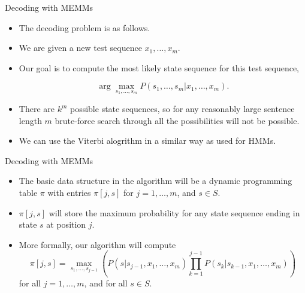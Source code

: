 \documentclass[handout]{beamer}
\begin{document}
\begin{frame}{Decoding with MEMMs}
\begin{scriptsize}
\begin{itemize}

\item The decoding problem is as follows.
\item We are given a new test sequence $x_1, \dots, x_m$.
\item Our goal is to compute the most likely state sequence for this test sequence,

\begin{equation}
 \operatorname{arg} \max_{s_1,\dots,s_m} P(s_1,\dots,s_m|x_1,\dots,x_m).
\end{equation}

\item There are $k^m$ possible state sequences, so for any reasonably large sentence length $m$ brute-force search through all the possibilities will not be possible.

\item We can use the Viterbi alogrithm in a similar way as used for HMMs.
 
\end{itemize}


\end{scriptsize}
\end{frame}



\begin{frame}{Decoding with MEMMs}
\begin{scriptsize}
\begin{itemize}

\item The basic data structure in the algorithm will be a dynamic programming table $\pi$ with entries $\pi[j,s]$ for $j=1, \dots, m$, and $s \in S$.

\item  $\pi[j,s]$ will store the maximum probability for any state sequence ending in state $s$ at position $j$.

\item More formally, our algorithm will compute 
\begin{displaymath}
\pi[j,s] =  \max_{s_1,\dots, s_{j-1}}\left(P(s | s_{j-1}, x_1, \dots, x_m) \prod_{k=1}^{j-1}    P(s_k | s_{k-1}, x_1, \dots, x_m)\right)
\end{displaymath}
for all $j = 1, \dots,m$, and for all $s \in S$.

\end{itemize}


\end{scriptsize}
\end{frame}
\end{document}
